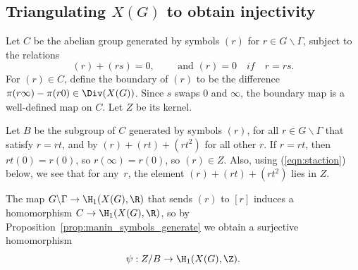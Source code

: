 \documentclass{report}
\begin{document}
\subsection{Triangulating $X(G)$ to obtain injectivity}

Let $C$ be the abelian group generated by symbols $(r)$ for $r\in
G\backslash \Gamma$, subject to the relations
\[
 (r) + (rs) = 0, \qquad\text{ and } (r)=0 \quad{ if }\quad r=rs.
\]
For $(r)\in C$, define the boundary of $(r)$ to be the difference
$\pi(r\infty)-\pi(r0)\in\Div(X(G))$.  Since $s$ swaps $0$ and
$\infty$, the boundary map is a well-defined map on $C$. Let $Z$
be its kernel.

Let $B$ be the subgroup of $C$ generated by symbols $(r)$, for all
$r\in G\backslash\Gamma$ that satisfy $r=rt$, and by
$(r)+(rt)+(rt^2)$ for all other $r$.  If $r=rt$, then $rt(0) =
r(0)$, so $r(\infty) = r(0)$, so $(r)\in Z$.   Also, using
(\ref{eqn:staction}) below, we see that for any~$r$, the element
$(r)+(rt)+(rt^2)$ lies in $Z$.

The map $G\backslash \Gamma\to \H_1(X(G),\R)$ that sends $(r)$ to
$[r]$ induces a homomorphism $C\to \H_1(X(G),\R)$, so by
Proposition~\ref{prop:manin_symbols_generate} we obtain a
surjective homomorphism
\[
  \psi: Z/B \to \H_1(X(G),\Z).
\]
\end{document}
